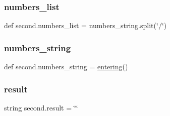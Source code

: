 \subsubsection{\texorpdfstring{numbers\+\_\+list}{numbers\_list}}
{\footnotesize\ttfamily def second.\+numbers\+\_\+list = numbers\+\_\+string.\+split(\char`\"{}/\char`\"{})}

\mbox{\label{namespacesecond_ac5dc13845221bc80b81590edab25f75f}} 
\subsubsection{\texorpdfstring{numbers\+\_\+string}{numbers\_string}}
{\footnotesize\ttfamily def second.\+numbers\+\_\+string = \hyperlink{namespacesecond_a4dff772c3e7049d2edb57b657c78e37d}{entering}()}

\mbox{\label{namespacesecond_a46a3d46a5525f7e7967e489a663b1236}} 
\subsubsection{\texorpdfstring{result}{result}}
{\footnotesize\ttfamily string second.\+result = \char`\"{}\char`\"{}}

